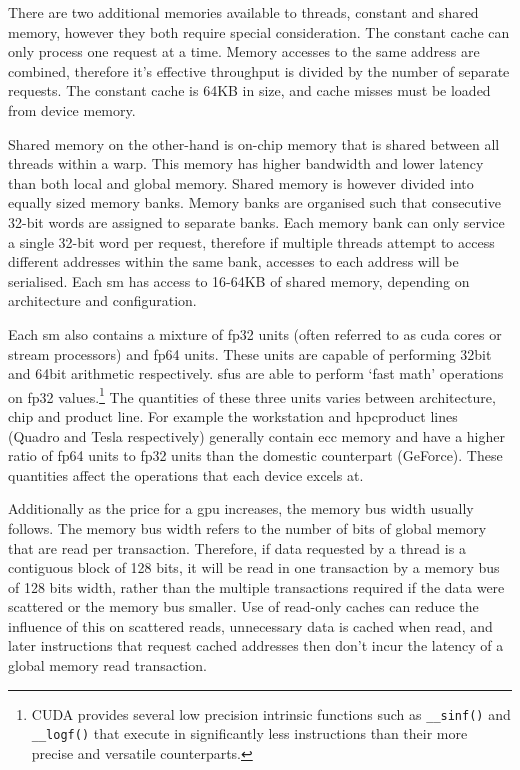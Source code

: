       There are two additional memories available to threads, constant and shared memory, however they both require special consideration. The constant cache can only process one request at a time. Memory accesses to the same address are combined, therefore it's effective throughput is divided by the number of separate requests. The constant cache is 64KB in size, and cache misses must be loaded from device memory.     
      
      Shared memory on the other-hand is \gls{on-chip} memory that is shared between all threads within a warp. This memory has higher bandwidth and lower latency than both local and global memory. Shared memory is however divided into equally sized memory banks. Memory banks are organised such that consecutive 32-bit words are assigned to separate banks. Each memory bank can only service a single 32-bit word per request, therefore if multiple threads attempt to access different addresses within the same bank, accesses to each address will be serialised. Each \gls{sm} has access to 16-64KB of shared memory, depending on architecture and configuration.
      
      Each \gls{sm} also contains a mixture of \gls{fp32} units (often referred to as \gls{cuda} cores or stream processors) and \gls{fp64} units. These units are capable of performing 32bit and 64bit arithmetic respectively. \glspl{sfu} are able to perform `fast math' operations on \gls{fp32} values.\footnote{CUDA provides several low precision intrinsic functions such as \lstinline!__sinf()! and \lstinline!__logf()! that execute in significantly less instructions than their more precise and versatile counterparts.} The quantities of these three units varies between architecture, chip and product line. For example the workstation and \gls{hpc}product lines (Quadro and Tesla respectively) generally contain \gls{ecc} memory and have a higher ratio of \gls{fp64} units to \gls{fp32} units than the domestic counterpart (GeForce). These quantities affect the operations that each device excels at.

      Additionally as the price for a \gls{gpu} increases, the memory bus width usually follows. The memory bus width refers to the number of bits of global memory that are read per transaction. Therefore, if data requested by a thread is a contiguous block of 128 bits, it will be read in one transaction by a memory bus of 128 bits width, rather than the multiple transactions required if the data were scattered or the memory bus smaller. Use of read-only caches can reduce the influence of this on scattered reads, unnecessary data is cached when read, and later instructions that request cached addresses then don't incur the latency of a global memory read transaction.
      
